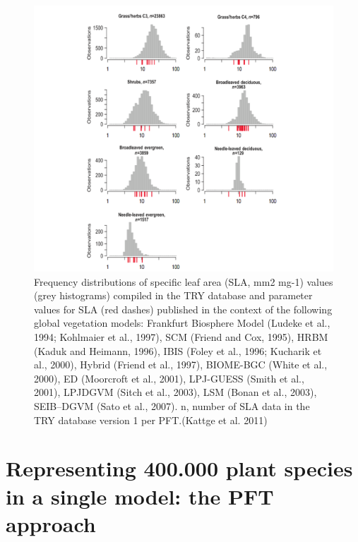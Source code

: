 \documentclass[12pt,oneside]{book}
\begin{document}
\begin{figure}

{\centering \includegraphics[width=0.8\linewidth]{figures/chap7/f711_try_models} 

}

\caption{Frequency distributions of specific leaf area (SLA, mm2 mg-1) values (grey histograms) compiled in the TRY database and parameter values for SLA (red dashes) published in the context of the following global vegetation models: Frankfurt Biosphere Model (Ludeke et al., 1994; Kohlmaier et al., 1997), SCM (Friend and Cox, 1995), HRBM (Kaduk and Heimann, 1996), IBIS (Foley et al., 1996; Kucharik et al., 2000), Hybrid (Friend et al., 1997), BIOME-BGC (White et al., 2000), ED (Moorcroft et al., 2001), LPJ-GUESS (Smith et al., 2001), LPJDGVM (Sitch et al., 2003), LSM (Bonan et al., 2003), SEIB–DGVM (Sato et al., 2007). n, number of SLA data in the TRY database version 1 per PFT.(Kattge et al. 2011)}\label{fig:f711}
\end{figure}

\section{Representing 400.000 plant species in a single model: the PFT
approach}\label{representing-400.000-plant-species-in-a-single-model-the-pft-approach}
\end{document}
